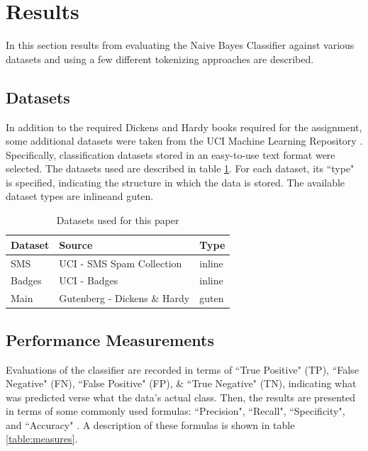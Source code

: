 \section{Results}
\label{section:results}
In this section results from evaluating the Naive Bayes Classifier against various datasets and using a few different
tokenizing approaches are described.

\subsection{Datasets}
\label{subsection:datasets}
In addition to the required Dickens and Hardy books required for the assignment, some additional datasets
were taken from the UCI Machine Learning Repository \cite{uci}. Specifically, classification datasets stored in an
easy-to-use text format were selected. The datasets used are described in table \ref{table:datasets}. For each dataset,
its ``type" is specified, indicating the structure in which the data is stored. The available dataset types are
inline\footnotemark[1] and guten\footnotemark[2].

\begin{table}
    \begin{tabular}{lll}
        \hline
        \textbf{Dataset} & \textbf{Source} & \textbf{Type} \\ [0.5ex]
        \hline\hline
        SMS & UCI - SMS Spam Collection & inline\footnotemark[1] \\
        Badges & UCI - Badges & inline \\
        Main & Gutenberg - Dickens \& Hardy & guten\footnotemark[2] \\
        \hline
    \end{tabular}
    \caption{Datasets used for this paper}
    \label{table:datasets}
\end{table}


\subsection{Performance Measurements}
\label{subsection:performanceMeasurements}
Evaluations of the classifier are recorded in terms of ``True Positive" (TP), ``False Negative" (FN), ``False Positive"
(FP), \& ``True Negative" (TN), indicating what was predicted verse what the data's actual class. Then, the results are
presented in terms of some commonly used formulas: ``Precision", ``Recall", ``Specificity", and ``Accuracy"
\cite{measures}. A description of these formulas is shown in table \ref{table:measures}.

